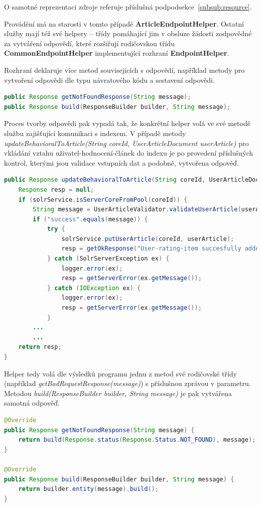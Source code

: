 \documentclass[thesis=M,czech]{FITthesis}[2014/05/07]
\begin{document}
O samotné reprezentaci zdroje referuje příslušná podpodsekce~\ref{subsub:resource}.

Provádění má na starosti v tomto případě \textbf{ArticleEndpointHelper}. Ostatní služby mají též své helpery – třídy pomáhající jim v obsluze žádosti zodpovědné za vytváření odpovědí, které rozšiřují rodičovskou třídu \textbf{CommonEndpointHelper} implementující rozhraní \textbf{EndpointHelper}.

Rozhraní deklaruje více metod souvisejících s odpovědí, například metody pro vytvoření odpovědi dle typu návratového kódu a sestavení odpovědi.

\begin{lstlisting}[language=java]
public Response getNotFoundResponse(String message);
public Response build(ResponseBuilder builder, String message);
\end{lstlisting}

Proces tvorby odpovědi pak vypadá tak, že konkrétní helper volá ve své metodě službu zajišťující komunikaci s indexem. V případě metody \emph{updateBehavioralToArticle(String coreId, UserArticleDocument userArticle)} pro vkládání vztahu uživatel-hodnocení-článek do indexu je po provedení příslušných kontrol, kterými jsou validace vstupních dat a podobně, vytvořena odpověď.

\begin{lstlisting}[language=java]
public Response updateBehavioralToArticle(String coreId, UserArticleDocument userArticle) {
    Response resp = null;
    if (solrService.isServerCoreFromPool(coreId)) {
        String message = UserArticleValidator.validateUserArticle(userArticle);
        if ("success".equals(message)) {
            try {
                solrService.putUserArticle(coreId, userArticle);
                resp = getOkResponse("User-rating-item succesfully added into Solr core.");
            } catch (SolrServerException ex) {
                logger.error(ex);
                resp = getServerError(ex.getMessage());
            } catch (IOException ex) {
                logger.error(ex);
                resp = getServerError(ex.getMessage());
            }
		...
		...
    return resp;
}
\end{lstlisting}

Helper tedy volá dle výsledků programu jednu z metod své rodičovské třídy (například \emph{getBadRequestResponse(message)}) s příslušnou zprávou v parametru. Metodou \emph{build(ResponseBuilder builder, String message)} je pak vytvářena samotná odpověď.

\begin{lstlisting}[language=java]
@Override
public Response getNotFoundResponse(String message) {
    return build(Response.status(Response.Status.NOT_FOUND), message);
}    

@Override
public Response build(ResponseBuilder builder, String message) {
    return builder.entity(message).build();
}
\end{lstlisting}
\end{document}
